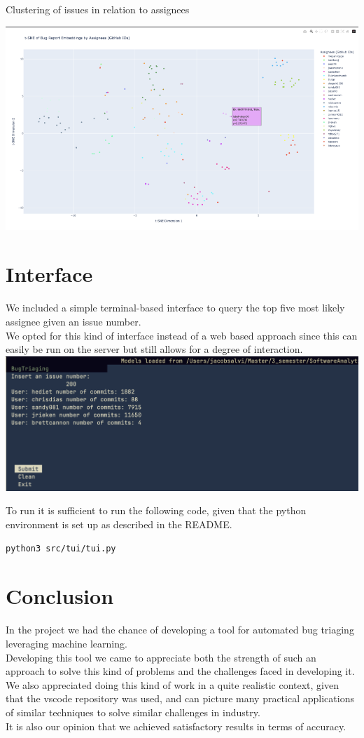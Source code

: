 \documentclass[tikz,10pt,fleqn]{article}
\begin{document}
\begin{table}[H]
	\centering
	\caption{Clustering of issues in relation to assignees}
	\includegraphics[width=\textwidth]{plot_sparse.png}
\end{table}
\section*{Interface}
We included a simple terminal-based interface to query the top five most likely assignee given an issue number.\\
We opted for this kind of interface instead of a web based approach since this can easily be run on the server but still allows for a degree of interaction.
\includegraphics[width=\textwidth]{./tui.png}

To run it is sufficient to run the following code, given that the python environment is set up as described in the README.
\begin{verbatim}
python3 src/tui/tui.py
\end{verbatim}

\section*{Conclusion}
In the project we had the chance of developing a tool for automated bug triaging leveraging machine learning.\\
Developing this tool we came to appreciate both the strength of such an approach to solve this kind of problems and the challenges faced in developing it.\\
We also appreciated doing this kind of work in a quite realistic context, given that the vscode repository was used, and can picture many practical applications of similar techniques to solve similar challenges in industry.\\
It is also our opinion that we achieved satisfactory results in terms of accuracy.
\end{document}
